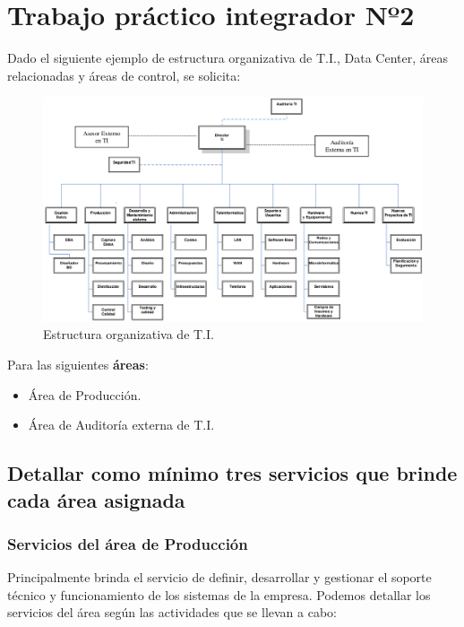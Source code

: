 \section{Trabajo práctico integrador Nº2}

Dado el siguiente ejemplo de estructura organizativa de T.I., Data Center, áreas relacionadas y áreas de control, se solicita:

\begin{figure}[h]
  \centering
  \includegraphics[width=.85\textwidth]{img/tp2_integrador/organigrama}
  \caption{Estructura organizativa de T.I.}
  \label{organigrama-enunciado}
\end{figure}

Para las siguientes \textbf{áreas}:

\begin{itemize}
    \item Área de Producción.
    \item Área de Auditoría externa de T.I.
\end{itemize}


\newpage

	\subsection{Detallar como mínimo tres servicios que brinde cada área asignada}
    
    \subsubsection{Servicios del área de Producción}
    
    Principalmente brinda el servicio de definir, desarrollar y gestionar el soporte técnico y funcionamiento de los sistemas de la empresa. 
    Podemos detallar los servicios del área según las actividades que se llevan a cabo:
    
